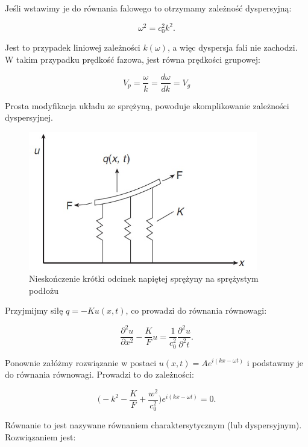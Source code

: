 Jeśli wstawimy je do równania falowego to otrzymamy zależność dyspersyjną:

\begin{equation}
\omega^2=c_0^2 k^2.
\end{equation}

Jest to przypadek liniowej zależności \( k(\omega)\), a więc dyspersja fali nie zachodzi. W takim przypadku prędkość fazowa, jest równa prędkości grupowej:

\begin{equation}
V_p=\frac{\omega}{k}=\frac{d\omega}{dk}=V_g
\end{equation}

Prosta modyfikacja układu ze sprężyną, powoduje skomplikowanie zależności dyspersyjnej.

\begin{figure}[h]
\centering
\includegraphics[width=10cm]{Zdjecia/2/dyspersja_analitycznie_sprezyna2}
\caption{Nieskończenie krótki odcinek napiętej sprężyny na sprężystym podłożu}
\label{fig:nieskonczenie_krotki_odcinek_sprezyny2}
\end{figure}

Przyjmijmy siłę \(q=-Ku(x,t)\), co prowadzi do równania równowagi:

\begin{equation}
\frac{\partial^2 u}{\partial x^2} - \frac{K}{F}u = \frac{1}{c_0^2} \frac{\partial^2 u}{\partial^2 t}.
\end{equation}

Ponownie załóżmy rozwiązanie w postaci \( u(x,t)=Ae^{i(kx-\omega t)} \) i podstawmy je do równania równowagi. Prowadzi to do zależności:

\begin{equation}
\Big(-k^2-\frac{K}{F}+\frac{w^2}{c_0^2}\Big)e^{i(kx-\omega t)}=0.
\end{equation}

Równanie to jest nazywane równaniem charaktersytycznym (lub dyspersyjnym). Rozwiązaniem jest:

